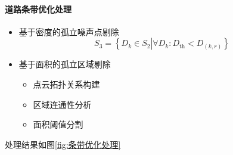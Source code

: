\paragraph{道路条带优化处理}
\begin{itemize}
	\item {\cukai 基于密度的孤立噪声点剔除}
		\begin{equation}
		S_3 = \left\lbrace D_k \in S_2 \left| ∀D_k : D_{\text{th}} < D_{(k,r)}  \right. \right\rbrace 
		\end{equation}
	\item {\cukai 基于面积的孤立区域剔除}
		\begin{itemize}
			\item 点云拓扑关系构建
			\item 区域连通性分析
			\item 面积阈值分割
		\end{itemize}
\end{itemize}
处理结果如图\ref{fig:条带优化处理}
